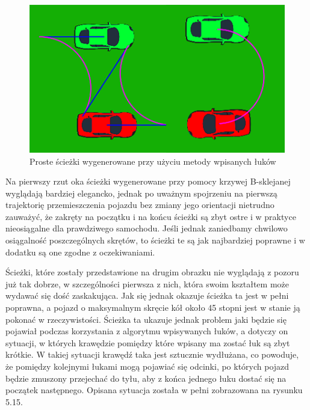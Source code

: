 \documentclass[a4paper,11pt,twoside]{report}
\theoremstyle{definition}
\begin{document}
\begin{figure}[h!]
\centering
\includegraphics[scale=0.9]{simplePath2}
\caption[Proste ścieżki wygenerowane przy użyciu metody wpisanych łuków]{Proste ścieżki wygenerowane przy użyciu metody wpisanych łuków}
\end{figure}

Na pierwszy rzut oka ścieżki wygenerowane przy pomocy krzywej B-sklejanej wyglądają bardziej elegancko, jednak po uważnym spojrzeniu na pierwszą trajektorię przemieszczenia pojazdu bez zmiany jego orientacji nietrudno zauważyć, że zakręty na początku i na końcu ścieżki są zbyt ostre i w praktyce nieosiągalne dla prawdziwego samochodu. Jeśli jednak zaniedbamy chwilowo osiągalność poszczególnych skrętów, to ścieżki te są jak najbardziej poprawne i w dodatku są one zgodne z oczekiwaniami.

Ścieżki, które zostały przedstawione na drugim obrazku nie wyglądają z pozoru już tak dobrze, w szczególności pierwsza z nich, która swoim kształtem może wydawać się dość zaskakująca. Jak się jednak okazuje ścieżka ta jest w pełni poprawna, a pojazd o maksymalnym skręcie kół około 45 stopni jest w stanie ją pokonać w rzeczywistości. Ścieżka ta ukazuje jednak problem jaki będzie się pojawiał podczas korzystania z algorytmu wpisywanych łuków, a dotyczy on sytuacji, w których krawędzie pomiędzy które wpisany ma zostać łuk są zbyt krótkie. W takiej sytuacji krawędź taka jest sztucznie wydłużana, co powoduje, że pomiędzy kolejnymi łukami mogą pojawiać się odcinki, po których pojazd będzie zmuszony przejechać do tyłu, aby z końca jednego łuku dostać się na początek następnego. Opisana sytuacja została w pełni zobrazowana na rysunku 5.15.
\end{document}
